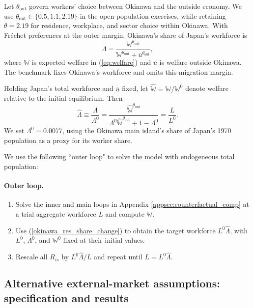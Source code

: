 \documentclass[12pt, unicode, a4paper]{article}
\newcommand{\1}{\mbox{1}\hspace{-0.25em}\mbox{l}} %
\begin{document}
Let $\theta_{\mathrm{out}}$ govern workers' choice between Okinawa and the outside economy. We use $\theta_{\mathrm{out}}\in\{0.5,1.1,2.19\}$ in the open-population exercises, while retaining $\theta=2.19$ for residence, workplace, and sector choice within Okinawa. With Fr\'{e}chet preferences at the outer margin, Okinawa's share of Japan's workforce is
\begin{equation}
\label{okinawa_res_share}
    \Lambda=\frac{\mathbb{W}^{\theta_{\mathrm{out}}}}{\mathbb{W}^{\theta_{\mathrm{out}}}+\overline{u}^{\theta_{\mathrm{out}}}},
\end{equation}
where $\mathbb{W}$ is expected welfare in (\ref{eq:welfare}) and $\overline u$ is welfare outside Okinawa. The benchmark fixes Okinawa's workforce and omits this migration margin.

Holding Japan's total workforce and $\overline u$ fixed, let $\widehat{\mathbb{W}}=\mathbb{W}/\mathbb{W}^0$ denote welfare relative to the initial equilibrium. Then
\begin{equation}
\label{okinawa_res_share_change}
    \widehat{\Lambda}\equiv\frac{\Lambda}{\Lambda^0}
    =\frac{\widehat{\mathbb{W}}^{\theta_{\mathrm{out}}}}
    {\Lambda^0\widehat{\mathbb{W}}^{\theta_{\mathrm{out}}}+1-\Lambda^0}
    =\frac{L}{L^0}.
\end{equation}
We set $\Lambda^0=0.0077$, using the Okinawa main island's share of Japan's 1970 population as a proxy for its worker share.

We use the following ``outer loop" to solve the model with endogeneous total population:

\paragraph{Outer loop.}
\begin{enumerate}
    \item Solve the inner and main loops in Appendix \ref{appsec:counterfactual_comp} at a trial aggregate workforce $L$ and compute $\mathbb{W}$.
    \item Use (\ref{okinawa_res_share_change}) to obtain the target workforce $L^0\widehat{\Lambda}$, with $L^0$, $\Lambda^0$, and $\mathbb{W}^0$ fixed at their initial values.
    \item Rescale all $R_{is}$ by $L^0\widehat{\Lambda}/L$ and repeat until $L=L^0\widehat{\Lambda}$.
\end{enumerate}

\clearpage

\subsection{Alternative external-market assumptions: specification and results}\label{appsec:counterfactual_external_maps}
\end{document}
